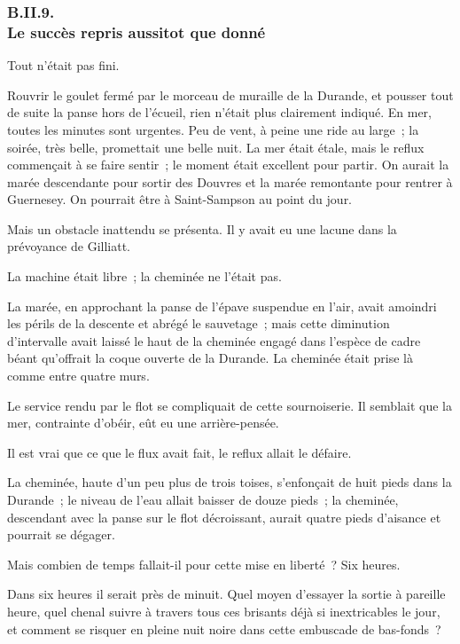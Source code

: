 \documentclass[french,twoside]{book} %
\begin{document}
 \subsubsection[{B.II.9. Le succès repris aussitot que donné}]{B.II.9. \\
Le succès repris aussitot que donné}
\noindent Tout n’était pas fini.\par
Rouvrir le goulet fermé par le morceau de muraille de la Durande, et pousser tout de suite la panse hors de l’écueil, rien n’était plus clairement indiqué. En mer, toutes les minutes sont urgentes. Peu de vent, à peine une ride au large ; la soirée, très belle, promettait une belle nuit. La mer était étale, mais le reflux commençait à se faire sentir ; le moment était excellent pour partir. On aurait la marée descendante pour sortir des Douvres et la marée remontante pour rentrer à Guernesey. On pourrait être à Saint-Sampson au point du jour.\par
Mais un obstacle inattendu se présenta. Il y avait eu une lacune dans la prévoyance de Gilliatt.\par
La machine était libre ; la cheminée ne l’était pas.\par
La marée, en approchant la panse de l’épave suspendue en l’air, avait amoindri les périls de la descente et abrégé le sauvetage ; mais cette diminution  d’intervalle avait laissé le haut de la cheminée engagé dans l’espèce de cadre béant qu’offrait la coque ouverte de la Durande. La cheminée était prise là comme entre quatre murs.\par
Le service rendu par le flot se compliquait de cette sournoiserie. Il semblait que la mer, contrainte d’obéir, eût eu une arrière-pensée.\par
Il est vrai que ce que le flux avait fait, le reflux allait le défaire.\par
La cheminée, haute d’un peu plus de trois toises, s’enfonçait de huit pieds dans la Durande ; le niveau de l’eau allait baisser de douze pieds ; la cheminée, descendant avec la panse sur le flot décroissant, aurait quatre pieds d’aisance et pourrait se dégager.\par
Mais combien de temps fallait-il pour cette mise en liberté ? Six heures.\par
Dans six heures il serait près de minuit. Quel moyen d’essayer la sortie à pareille heure, quel chenal suivre à travers tous ces brisants déjà si inextricables le jour, et comment se risquer en pleine nuit noire dans cette embuscade de bas-fonds ?\par
\end{document}

